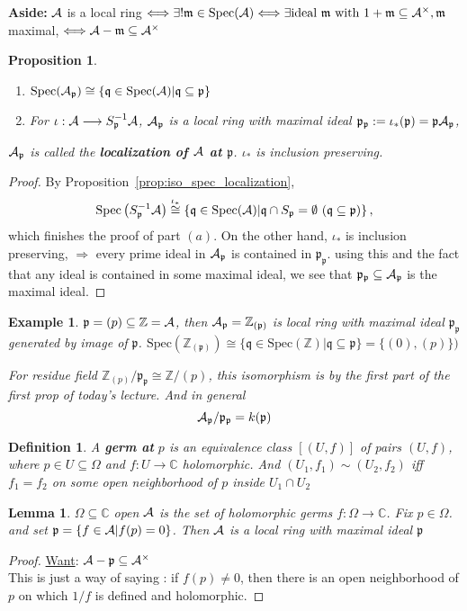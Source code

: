 \documentclass[11pt]{article}
\newtheorem{prop}[thm]{Proposition}
\newtheorem{lemma}[thm]{Lemma}
\newtheorem{dfn}[thm]{Definition}
\newtheorem{ex}[thm]{Example}
\newcommand{\cplx}{\mathbb C}
\newcommand{\intg}{\mathbb Z}
\newcommand{\scm}{{\mathfrak m}}
\newcommand{\scp}{{\mathfrak p}}
\newcommand{\scq}{\mathfrak q}
\newcommand{\cala}{{\cal A}}
\newcommand{\Lrta}{\Longrightarrow}
\newcommand{\lrta}{\longrightarrow}
\newcommand{\Llrta}{\Longleftrightarrow}
\begin{document}
\textbf{Aside:} $\cala$ is a local ring  $\Llrta\exists !\scm\in \text{Spec}(\cala)\Llrta \exists \text{ideal }\scm\text{ with }1+\scm\subseteq \cala^\times, \scm$ maximal,
$\Llrta \cala-\scm\subseteq \cala^\times$


\begin{prop}\ 
\begin{enumerate}[label=(\alph*)]
\item $\text{Spec}(\cala_\scp)\cong \{\scq\in \text{Spec}(\cala)|\scq\subseteq\scp\}$
\item For $\iota :\cala\lrta S^{-1}_{\scp}\cala$, $\cala_\scp$ is a local ring with maximal ideal $\scp_\scp:=\iota_*(\scp)=\scp\cala_\scp$,
\end{enumerate}
$\cala_\scp$ is called the \textbf{localization of $\cala$ at $\scp$}. $\iota_*$ is inclusion preserving.
\end{prop}
\begin{proof}
By Proposition~\ref{prop:iso_spec_localization},
$$
\text{Spec}\left(S^{-1}_{\scp}\cala\right)\overset{\iota_*}{\cong}\left\{\scq\in \text{Spec}(\cala)|\scq\cap S_\scp =\emptyset \ (\scq\subseteq \scp)\right\},
$$
which finishes the proof of part $(a)$. On the other hand,
$\iota_*$ is inclusion preserving,
$\Lrta$ every prime ideal in $\cala_\scp$ is contained in $\scp_\scp$. using this and the fact that any ideal is contained in some maximal ideal, we see that $\scp_\scp\subseteq \cala_\scp$ is the maximal ideal.
\end{proof}

\begin{ex}
$\scp=(p)\subseteq\intg=\cala$, then $\cala_\scp=\intg_{(\scp)}$ is local ring with maximal ideal $\scp_\scp$ generated by image of $\scp$. $\text{Spec}(\intg_{(\scp)})\cong \{\scq \in \text{Spec}(\intg)|\scq\subseteq \scp\}=\{(0),(p)\})$

For residue field $\intg_{(p)}/\scp_\scp\cong \intg/(p)$, this isomorphism is by the first part of the first prop of today's lecture. And in general
$$
\cala_\scp/\scp_\scp=k(\scp)
$$
\end{ex}


\begin{dfn}
A \textbf{germ at} $p$ is an equivalence class $[(U,f)]$ of pairs $(U,f)$, where $p\in U\subseteq \Omega$ and $f:U\lrta \cplx$ holomorphic. And $(U_1,f_1)\sim (U_2,f_2)$ iff $f_1=f_2$ on some open neighborhood of $p$ inside $U_1\cap U_2$
\end{dfn}
\begin{lemma}
$\Omega\subseteq \cplx$ open $\cala$ is the set of holomorphic germs $f:\Omega\lrta \cplx$. Fix $p\in\Omega$. and set $\scp=\{f\in \cala|f(p)=0\}$. Then $\cala$ is a local ring with maximal ideal $\scp$
\end{lemma}
\begin{proof}
\underline{Want}: $\cala-\scp\subseteq \cala^\times$\\

This is just a way of saying : if $f(p)\neq 0$, then there is an open neighborhood of $p$ on which $1/f$ is defined and holomorphic.
\end{proof}
\end{document}
